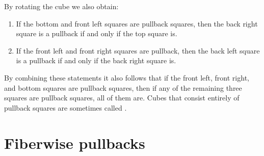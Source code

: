 \begin{rmk}
By rotating the cube we also obtain:
\begin{enumerate}
\item If the bottom and front left squares are pullback squares, then the back right square is a pullback if and only if the top square is.
\item If the front left and front right squares are pullback, then the back left square is a pullback if and only if the back right square is.
\end{enumerate}
By combining these statements it also follows that if the front left, front right, and bottom squares are pullback squares, then if any of the remaining three squares are pullback squares, all of them are. Cubes that consist entirely of pullback squares are sometimes called .
\end{rmk}

\section{Fiberwise pullbacks}

